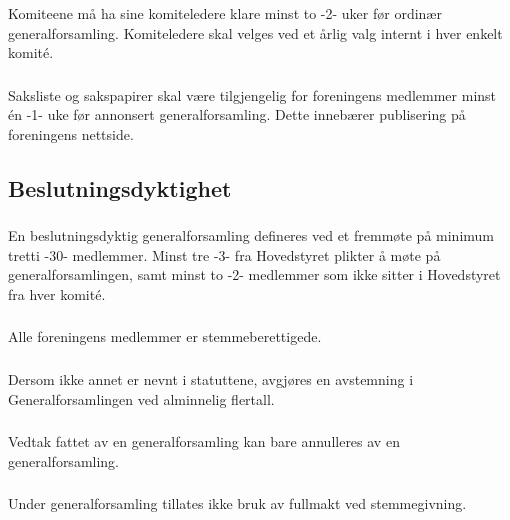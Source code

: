 \subsubsection{}
Komiteene må ha sine komiteledere klare minst to -2- uker før ordinær
generalforsamling. Komiteledere skal velges ved et årlig valg internt i hver enkelt komité.

\subsubsection{}
Saksliste og sakspapirer skal være tilgjengelig for foreningens medlemmer minst
én -1- uke før annonsert generalforsamling. Dette innebærer publisering på
foreningens nettside.


\subsection{Beslutningsdyktighet}
\subsubsection{}
En beslutningsdyktig generalforsamling defineres ved et fremmøte på minimum
tretti -30- medlemmer. Minst tre -3- fra Hovedstyret
plikter å møte på generalforsamlingen, samt minst to -2- medlemmer som ikke sitter i
Hovedstyret fra hver komité.

\subsubsection{}
Alle foreningens medlemmer er stemmeberettigede.

\subsubsection{}
Dersom ikke annet er nevnt i statuttene, avgjøres en avstemning i Generalforsamlingen ved
alminnelig flertall.

\subsubsection{}
Vedtak fattet av en generalforsamling kan bare annulleres av en generalforsamling.

\subsubsection{}
Under generalforsamling tillates ikke bruk av fullmakt ved stemmegivning.

